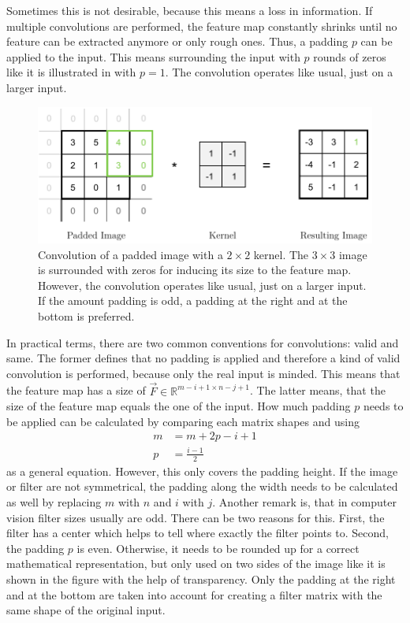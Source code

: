 Sometimes this is not desirable, because this means a loss in information.
If multiple convolutions are performed, the feature map constantly shrinks until no feature can be extracted anymore or only rough ones.
Thus, a padding $p$ can be applied to the input.
This means surrounding the input with $p$ rounds of zeros like it is illustrated in  with $p=1$.
The convolution operates like usual, just on a larger input.
\begin{figure}
	\centering
	\includegraphics{images/convolution_padding.pdf}
	\caption[Convolution of a Padded Image with a Kernel]{Convolution of a padded image with a $2 \times 2$ kernel. The $3 \times 3$ image is surrounded with zeros for inducing its size to the feature map. However, the convolution operates like usual, just on a larger input. If the amount padding is odd, a padding at the right and at the bottom is preferred.}
	\label{fig:convolution-padding}
\end{figure}
In practical terms, there are two common conventions for convolutions: valid and same.
The former defines that no padding is applied and therefore a kind of valid convolution is performed, because only the real input is minded.
This means that the feature map has a size of $\vec{F} \in \mathbb{R}^{m-i+1 \times n-j+1}$.
The latter means, that the size of the feature map equals the one of the input.
How much padding $p$ needs to be applied can be calculated by comparing each matrix shapes and using
\begin{align}
	m &= m+2p-i+1 \\
	p &= \frac{i-1}{2}
\end{align}
as a general equation.
However, this only covers the padding height.
If the image or filter are not symmetrical, the padding along the width needs to be calculated as well by replacing $m$ with $n$ and $i$ with $j$.
Another remark is, that in computer vision filter sizes usually are odd.
There can be two reasons for this.
First, the filter has a center which helps to tell where exactly the filter points to.
Second, the padding $p$ is even.
Otherwise, it needs to be rounded up for a correct mathematical representation, but only used on two sides of the image like it is shown in the figure with the help of transparency.
Only the padding at the right and at the bottom are taken into account for creating a filter matrix with the same shape of the original input.

